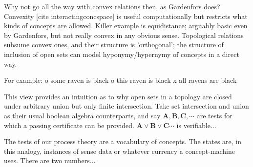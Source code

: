 Why not go all the way with convex relations then, as Gardenfors does?
Convexity [cite interactingconcspace] is useful computationally but restricts what kinds of concepts are allowed.
Killer example is equidistance; arguably basic even by Gardenfors, but not really convex in any obvious sense.
Topological relations subsume convex ones, and their structure is 'orthogonal';
the structure of inclusion of open sets can model hyponymy/hypernymy of concepts in a direct way.


For example:
o some raven is black
o this raven is black
x all ravens are black

This view provides an intuition as to why open sets in a topology are closed under arbitrary union but only finite intersection. Take set intersection and union as their usual boolean algebra counterparts, and say $\mathbf{A}, \mathbf{B}, \mathbf{C}, \cdots$ are tests for which a passing certificate can be provided. $\mathbf{A} \vee \mathbf{B} \vee \mathbf{C} \cdots$ is verifiable...

The tests of our process theory are a vocabulary of concepts. The states are, in this analogy, instances of sense data or whatever currency a concept-machine uses. There are two numbers...

